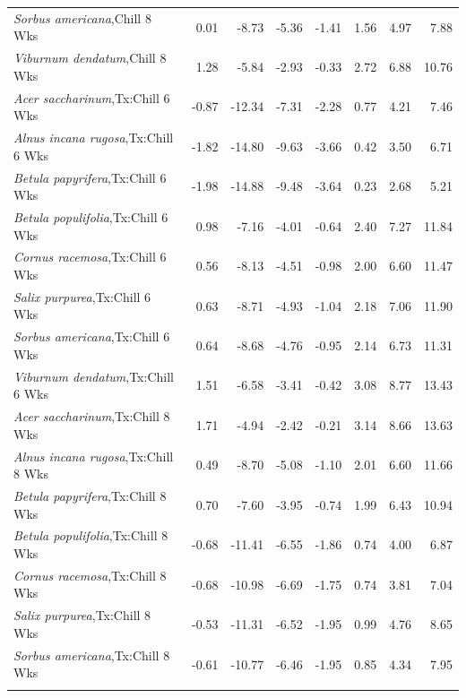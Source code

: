 \documentclass{article}\usepackage[]{graphicx}\usepackage[]{color}
\begin{document}
\begin{longtable}{lrrrrrrr}
  \textit{Sorbus americana},Chill 8 Wks & 0.01 & -8.73 & -5.36 & -1.41 & 1.56 & 4.97 & 7.88 \\ 
  \textit{Viburnum dendatum},Chill 8 Wks & 1.28 & -5.84 & -2.93 & -0.33 & 2.72 & 6.88 & 10.76 \\ 
  \textit{Acer saccharinum},Tx:Chill 6 Wks & -0.87 & -12.34 & -7.31 & -2.28 & 0.77 & 4.21 & 7.46 \\ 
  \textit{Alnus incana rugosa},Tx:Chill 6 Wks & -1.82 & -14.80 & -9.63 & -3.66 & 0.42 & 3.50 & 6.71 \\ 
  \textit{Betula papyrifera},Tx:Chill 6 Wks & -1.98 & -14.88 & -9.48 & -3.64 & 0.23 & 2.68 & 5.21 \\ 
  \textit{Betula populifolia},Tx:Chill 6 Wks & 0.98 & -7.16 & -4.01 & -0.64 & 2.40 & 7.27 & 11.84 \\ 
  \textit{Cornus racemosa},Tx:Chill 6 Wks & 0.56 & -8.13 & -4.51 & -0.98 & 2.00 & 6.60 & 11.47 \\ 
  \textit{Salix purpurea},Tx:Chill 6 Wks & 0.63 & -8.71 & -4.93 & -1.04 & 2.18 & 7.06 & 11.90 \\ 
  \textit{Sorbus americana},Tx:Chill 6 Wks & 0.64 & -8.68 & -4.76 & -0.95 & 2.14 & 6.73 & 11.31 \\ 
  \textit{Viburnum dendatum},Tx:Chill 6 Wks & 1.51 & -6.58 & -3.41 & -0.42 & 3.08 & 8.77 & 13.43 \\ 
  \textit{Acer saccharinum},Tx:Chill 8 Wks & 1.71 & -4.94 & -2.42 & -0.21 & 3.14 & 8.66 & 13.63 \\ 
  \textit{Alnus incana rugosa},Tx:Chill 8 Wks & 0.49 & -8.70 & -5.08 & -1.10 & 2.01 & 6.60 & 11.66 \\ 
  \textit{Betula papyrifera},Tx:Chill 8 Wks & 0.70 & -7.60 & -3.95 & -0.74 & 1.99 & 6.43 & 10.94 \\ 
  \textit{Betula populifolia},Tx:Chill 8 Wks & -0.68 & -11.41 & -6.55 & -1.86 & 0.74 & 4.00 & 6.87 \\ 
  \textit{Cornus racemosa},Tx:Chill 8 Wks & -0.68 & -10.98 & -6.69 & -1.75 & 0.74 & 3.81 & 7.04 \\ 
  \textit{Salix purpurea},Tx:Chill 8 Wks & -0.53 & -11.31 & -6.52 & -1.95 & 0.99 & 4.76 & 8.65 \\ 
  \textit{Sorbus americana},Tx:Chill 8 Wks & -0.61 & -10.77 & -6.46 & -1.95 & 0.85 & 4.34 & 7.95 \\ 
   \hline
\hline
\label{tab:suppmodtotbio}
\end{longtable}
\end{document}
